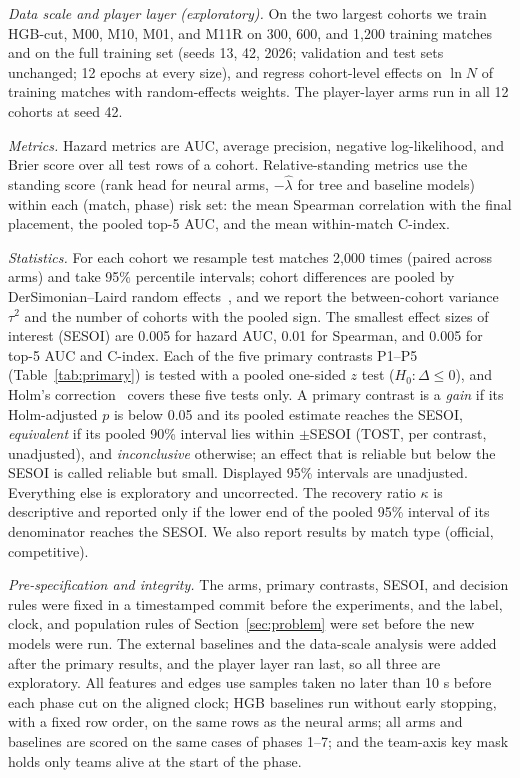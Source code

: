 \emph{Data scale and player layer (exploratory).} On the two largest cohorts we train HGB-cut, M00, M10, M01, and M11R on 300, 600, and 1,200 training matches and on the full training set (seeds 13, 42, 2026; validation and test sets unchanged; 12 epochs at every size), and regress cohort-level effects on $\ln N$ of training matches with random-effects weights. The player-layer arms run in all 12 cohorts at seed 42.

\emph{Metrics.} Hazard metrics are AUC, average precision, negative log-likelihood, and Brier score over all test rows of a cohort. Relative-standing metrics use the standing score (rank head for neural arms, $-\hat\lambda$ for tree and baseline models) within each (match, phase) risk set: the mean Spearman correlation with the final placement, the pooled top-5 AUC, and the mean within-match C-index.

\emph{Statistics.} For each cohort we resample test matches 2,000 times (paired across arms) and take 95\% percentile intervals; cohort differences are pooled by DerSimonian--Laird random effects~\cite{dersimonian1986metaanalysis}, and we report the between-cohort variance $\tau^2$ and the number of cohorts with the pooled sign. The smallest effect sizes of interest (SESOI) are 0.005 for hazard AUC, 0.01 for Spearman, and 0.005 for top-5 AUC and C-index. Each of the five primary contrasts P1--P5 (Table~\ref{tab:primary}) is tested with a pooled one-sided $z$ test ($H_0\colon\Delta\le0$), and Holm's correction~\cite{holm1979simple} covers these five tests only. A primary contrast is a \emph{gain} if its Holm-adjusted $p$ is below 0.05 and its pooled estimate reaches the SESOI, \emph{equivalent} if its pooled 90\% interval lies within $\pm$SESOI (TOST, per contrast, unadjusted), and \emph{inconclusive} otherwise; an effect that is reliable but below the SESOI is called reliable but small. Displayed 95\% intervals are unadjusted. Everything else is exploratory and uncorrected. The recovery ratio $\kappa$ is descriptive and reported only if the lower end of the pooled 95\% interval of its denominator reaches the SESOI. We also report results by match type (official, competitive).

\emph{Pre-specification and integrity.} The arms, primary contrasts, SESOI, and decision rules were fixed in a timestamped commit before the experiments, and the label, clock, and population rules of Section~\ref{sec:problem} were set before the new models were run. The external baselines and the data-scale analysis were added after the primary results, and the player layer ran last, so all three are exploratory. All features and edges use samples taken no later than 10 s before each phase cut on the aligned clock; HGB baselines run without early stopping, with a fixed row order, on the same rows as the neural arms; all arms and baselines are scored on the same cases of phases 1--7; and the team-axis key mask holds only teams alive at the start of the phase.
